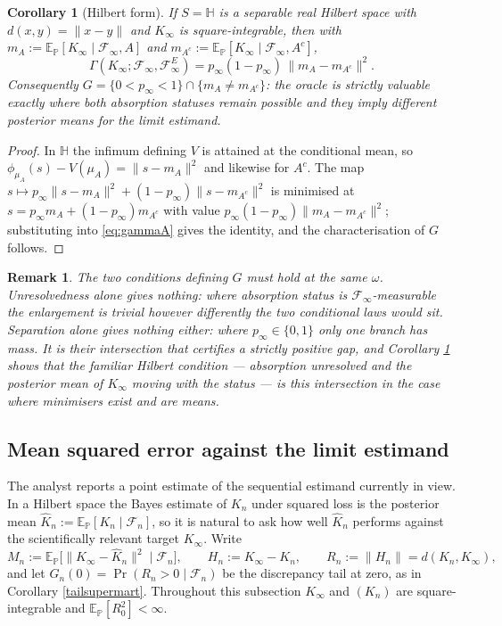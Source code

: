 \documentclass{article}
\newcommand{\E}{\mathbb{E}_{\mathbb{P}}}
\newcommand{\F}{\mathcal{F}}
\newcommand{\1}{\mathbbm{1}}
\newtheorem{remark}{Remark}
\newtheorem{cor}{Corollary}
\begin{document}
\begin{cor}[Hilbert form]
\label{oraclehilbert}
If $S=\mathbb{H}$ is a separable real Hilbert space with $d(x,y)=\|x-y\|$ and $K_\infty$ is
square-integrable, then with
$m_A:=\E[K_\infty\mid\F_\infty,A]$ and $m_{A^c}:=\E[K_\infty\mid\F_\infty,A^c]$,
\[
\Gamma(K_\infty;\F_\infty,\F^E_\infty)=p_\infty(1-p_\infty)\,\big\|m_A-m_{A^c}\big\|^2 .
\]
Consequently $G=\{0<p_\infty<1\}\cap\{m_A\ne m_{A^c}\}$: the oracle is strictly valuable exactly
where both absorption statuses remain possible and they imply different posterior means for the
limit estimand.
\end{cor}

\begin{proof}
In $\mathbb{H}$ the infimum defining $V$ is attained at the conditional mean, so
$\phi_{\mu_A}(s)-V(\mu_A)=\|s-m_A\|^2$ and likewise for $A^c$. The map
$s\mapsto p_\infty\|s-m_A\|^2+(1-p_\infty)\|s-m_{A^c}\|^2$ is minimised at
$s=p_\infty m_A+(1-p_\infty)m_{A^c}$ with value $p_\infty(1-p_\infty)\|m_A-m_{A^c}\|^2$;
substituting into \eqref{eq:gammaA} gives the identity, and the characterisation of $G$ follows.
\end{proof}

\begin{remark}
The two conditions defining $G$ must hold at the same $\omega$. Unresolvedness alone gives nothing:
where absorption status is $\F_\infty$-measurable the enlargement is trivial however differently
the two conditional laws would sit. Separation alone gives nothing either: where $p_\infty\in\{0,1\}$
only one branch has mass. It is their intersection that certifies a strictly positive gap, and
Corollary \ref{oraclehilbert} shows that the familiar Hilbert condition --- absorption unresolved
and the posterior mean of $K_\infty$ moving with the status --- is this intersection in the case
where minimisers exist and are means.
\end{remark}

\subsection*{Mean squared error against the limit estimand}

The analyst reports a point estimate of the sequential estimand currently in view. In a Hilbert
space the Bayes estimate of $K_n$ under squared loss is the posterior mean
$\widehat K_n:=\E[K_n\mid\F_n]$, so it is natural to ask how well $\widehat K_n$ performs against
the scientifically relevant target $K_\infty$. Write
\[
M_n:=\E\big[\|K_\infty-\widehat K_n\|^2\;\big|\;\F_n\big],
\qquad
H_n:=K_\infty-K_n,
\qquad
R_n:=\|H_n\|=d(K_n,K_\infty),
\]
and let $G_n(0)=\Pr(R_n>0\mid\F_n)$ be the discrepancy tail at zero, as in Corollary
\ref{tailsupermart}. Throughout this subsection $K_\infty$ and $(K_n)$ are square-integrable and
$\E[R_0^2]<\infty$.
\end{document}
